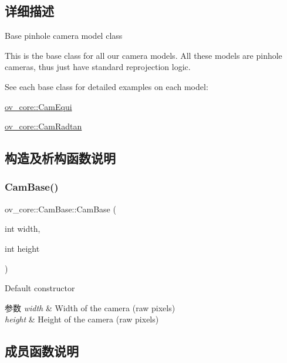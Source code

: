 \subsection{详细描述}
Base pinhole camera model class 

This is the base class for all our camera models. All these models are pinhole cameras, thus just have standard reprojection logic.

See each base class for detailed examples on each model\+:
\begin{DoxyItemize}
\item \hyperlink{classov__core_1_1CamEqui}{ov\+\_\+core\+::\+Cam\+Equi}
\item \hyperlink{classov__core_1_1CamRadtan}{ov\+\_\+core\+::\+Cam\+Radtan} 
\end{DoxyItemize}

\subsection{构造及析构函数说明}
\mbox{\label{classov__core_1_1CamBase_a1f11a6e4e8324d6843b578c0dabe0f94}} 
\subsubsection{\texorpdfstring{Cam\+Base()}{CamBase()}}
{\footnotesize\ttfamily ov\+\_\+core\+::\+Cam\+Base\+::\+Cam\+Base (\begin{DoxyParamCaption}\item[{int}]{width,  }\item[{int}]{height }\end{DoxyParamCaption})\hspace{0.3cm}{\ttfamily [inline]}}



Default constructor 


\begin{DoxyParams}{参数}
{\em width} & Width of the camera (raw pixels) \\
\hline
{\em height} & Height of the camera (raw pixels) \\
\hline
\end{DoxyParams}


\subsection{成员函数说明}
\mbox{\label{classov__core_1_1CamBase_a498fa2b56be008d7b59bf9927f60d5db}} 
